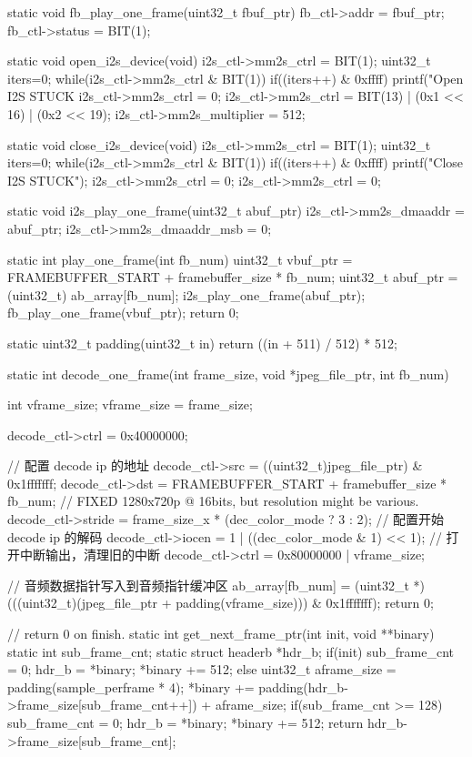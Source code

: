 \begin{CodeBlock}[language=BookC]
static void fb_play_one_frame(uint32_t fbuf_ptr) {
    fb_ctl->addr = fbuf_ptr;
    fb_ctl->status = BIT(1);
}

static void open_i2s_device(void) {
    i2s_ctl->mm2s_ctrl = BIT(1);
    uint32_t iters=0;
    while(i2s_ctl->mm2s_ctrl & BIT(1)) {
        if((iters++) & 0xffff) {
            printf("Open I2S STUCK %
            i2s_ctl->mm2s_ctrl = 0;
        }
    }
    i2s_ctl->mm2s_ctrl = BIT(13) | (0x1 << 16) | (0x2 << 19);
    i2s_ctl->mm2s_multiplier = 512;
}

static void close_i2s_device(void) {
    i2s_ctl->mm2s_ctrl = BIT(1);
    uint32_t iters=0;
    while(i2s_ctl->mm2s_ctrl & BIT(1)){
        if((iters++) & 0xffff) {
            printf("Close I2S STUCK");
            i2s_ctl->mm2s_ctrl = 0;
        }
    }
    i2s_ctl->mm2s_ctrl = 0;
}

static void i2s_play_one_frame(uint32_t abuf_ptr) {
    i2s_ctl->mm2s_dmaaddr = abuf_ptr;
    i2s_ctl->mm2s_dmaaddr_msb = 0;
}

static int play_one_frame(int fb_num)
{
    uint32_t vbuf_ptr = FRAMEBUFFER_START + framebuffer_size * fb_num;
    uint32_t abuf_ptr = (uint32_t) ab_array[fb_num];
    i2s_play_one_frame(abuf_ptr);
    fb_play_one_frame(vbuf_ptr);
    return 0;
}

static uint32_t padding(uint32_t in)
{
    return ((in + 511) / 512) * 512;
}

static int decode_one_frame(int frame_size,
                            void *jpeg_file_ptr,
                            int fb_num)
{
    int vframe_size;
    vframe_size = frame_size;

    decode_ctl->ctrl = 0x40000000;

    // 配置 decode ip 的地址
    decode_ctl->src = ((uint32_t)jpeg_file_ptr) & 0x1fffffff;
    decode_ctl->dst = FRAMEBUFFER_START + framebuffer_size * fb_num;
    // FIXED 1280x720p @ 16bits, but resolution might be various.
    decode_ctl->stride = frame_size_x * (dec_color_mode ? 3 : 2); 
    // 配置开始 decode ip 的解码
    decode_ctl->iocen = 1 | ((dec_color_mode & 1) << 1); // 打开中断输出，清理旧的中断
    decode_ctl->ctrl  = 0x80000000 | vframe_size;

    // 音频数据指针写入到音频指针缓冲区
    ab_array[fb_num] = 
      (uint32_t *)(((uint32_t)(jpeg_file_ptr + padding(vframe_size))) & 0x1fffffff);
    return 0;
}

// return 0 on finish.
static int get_next_frame_ptr(int init, void **binary)
{
    static int sub_frame_cnt;
    static struct headerb *hdr_b;
    if(init) {
        sub_frame_cnt = 0;
        hdr_b = *binary;
        *binary += 512;
    } else {
        uint32_t aframe_size = padding(sample_perframe * 4);
        *binary += padding(hdr_b->frame_size[sub_frame_cnt++]) + aframe_size;
    }
    if(sub_frame_cnt >= 128) {
        sub_frame_cnt = 0;
        hdr_b = *binary;
        *binary += 512;
    }
    return hdr_b->frame_size[sub_frame_cnt];
}


\end{CodeBlock}
